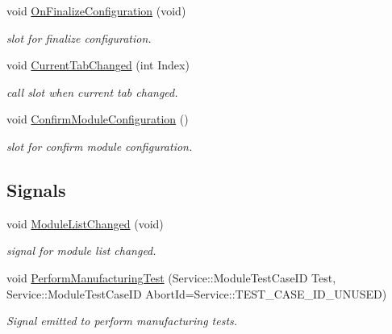 \begin{DoxyCompactItemize}
void \hyperlink{classSystemTracking_1_1CMainControl_a341ffbc353fc0bac77318eae146bf4d1}{\-On\-Finalize\-Configuration} (void)
\begin{DoxyCompactList}\small\item\em slot for finalize configuration. \end{DoxyCompactList}\item 
void \hyperlink{classSystemTracking_1_1CMainControl_a40d476648b94f3b5cc8892cbfe130f61}{\-Current\-Tab\-Changed} (int \-Index)
\begin{DoxyCompactList}\small\item\em call slot when current tab changed. \end{DoxyCompactList}\item 
void \hyperlink{classSystemTracking_1_1CMainControl_ae3a35ef6c557bc66707db334a50a5280}{\-Confirm\-Module\-Configuration} ()
\begin{DoxyCompactList}\small\item\em slot for confirm module configuration. \end{DoxyCompactList}\end{DoxyCompactItemize}
\subsection*{\-Signals}
\begin{DoxyCompactItemize}
\item 
void \hyperlink{classSystemTracking_1_1CMainControl_a170db7621bebcfbad548d4fda46bdc77}{\-Module\-List\-Changed} (void)
\begin{DoxyCompactList}\small\item\em signal for module list changed. \end{DoxyCompactList}\item 
void \hyperlink{classSystemTracking_1_1CMainControl_a9e6df472eeaeb35d0d202b91945fbe92}{\-Perform\-Manufacturing\-Test} (\-Service\-::\-Module\-Test\-Case\-I\-D \-Test, \-Service\-::\-Module\-Test\-Case\-I\-D \-Abort\-Id=\-Service\-::\-T\-E\-S\-T\-\_\-\-C\-A\-S\-E\-\_\-\-I\-D\-\_\-\-U\-N\-U\-S\-E\-D)
\begin{DoxyCompactList}\small\item\em \-Signal emitted to perform manufacturing tests. \end{DoxyCompactList}\end{DoxyCompactItemize}
